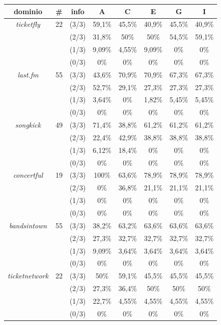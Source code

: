 \documentclass[a4paper]{report}
\begin{document}
\begin{center}
\begin{tabular}{|cccccccc|}
\hline
dominio & \# & info & A & C & E & G & I \\
\hline
\textit{ticketfly} &22& (3/3) & 59,1\%& 45,5\%& 40,9\%& 45,5\%& 40,9\% \\
& & (2/3) & 31,8\%& 50\%& 50\%& 54,5\%& 59,1\% \\
& & (1/3) & 9,09\%&4,55\%& 9,09\%& 0\%& 0\% \\
& & (0/3) & 0\%& 0\%& 0\%& 0\%& 0\% \\
\hline
\textit{last.fm} &55& (3/3) & 43,6\%& 70,9\%& 70,9\%& 67,3\%& 67,3\%\\ 
 & & (2/3) & 52,7\%& 29,1\%& 27,3\%& 27,3\%& 27,3\% \\
 & & (1/3) & 3,64\%& 0\%& 1,82\%& 5,45\%& 5,45\% \\
 & & (0/3) & 0\%& 0\%& 0\%& 0\%& 0\% \\
\hline
\textit{songkick} &49& (3/3) & 71,4\%& 38,8\%& 61,2\%& 61,2\%& 61,2\%\\
 & & (2/3) & 22,4\%& 42,9\%& 38,8\%& 38,8\%& 38,8\%\\
 & & (1/3) & 6,12\%& 18,4\%& 0\%& 0\%& 0\%\\
 & & (0/3) & 0\%& 0\%& 0\%& 0\%& 0\%\\
\hline

\textit{concertful} &19& (3/3) & 100\%& 63,6\%& 78,9\%& 78,9\%& 78,9\% \\
& & (2/3) & 0\%& 36,8\%& 21,1\%& 21,1\%& 21,1\% \\
& & (1/3) & 0\%& 0\%& 0\%& 0\%& 0\% \\
& & (0/3) & 0\%& 0\%& 0\%& 0\%& 0\% \\
\hline
\textit{bandsintown} &55& (3/3) & 38,2\%& 63,2\%& 63,6\%& 63,6\%& 63,6\% \\
& & (2/3) & 27,3\%& 32,7\%& 32,7\%& 32,7\%& 32,7\% \\
& & (1/3) & 9,09\%& 3,64\%& 3,64\%& 3,64\%& 3,64\% \\
& & (0/3) & 0\%& 0\%& 0\%& 0\%& 0\% \\
\hline
\textit{ticketnetwork} &22& (3/3) & 50\%& 59,1\%& 45,5\%& 45,5\%& 45,5\% \\
& & (2/3) & 27,3\%& 36,4\%& 50\%& 50\%& 50\% \\
& & (1/3) & 22,7\%& 4,55\%& 4,55\%& 4,55\%& 4,55\% \\
& & (0/3) & 0\%& 0\%& 0\%& 0\%& 0\% \\
\hline
\end{tabular}
\end{center}
\end{document}
